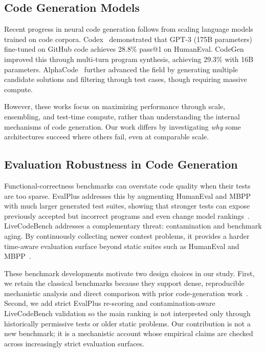\documentclass[preprint,12pt,authoryear]{elsarticle}
\begin{document}
\subsection{Code Generation Models}

Recent progress in neural code generation follows from scaling language models trained on code corpora. Codex~\cite{chen2021humaneval} demonstrated that GPT-3 (175B parameters) fine-tuned on GitHub code achieves 28.8\% pass@1 on HumanEval. CodeGen~\cite{nijkamp2022codegen} improved this through multi-turn program synthesis, achieving 29.3\% with 16B parameters. AlphaCode~\cite{li2022competition} further advanced the field by generating multiple candidate solutions and filtering through test cases, though requiring massive compute.

However, these works focus on maximizing performance through scale, ensembling, and test-time compute, rather than understanding the internal mechanisms of code generation. Our work differs by investigating \emph{why} some architectures succeed where others fail, even at comparable scale.

\subsection{Evaluation Robustness in Code Generation}

Functional-correctness benchmarks can overstate code quality when their tests are too sparse. EvalPlus addresses this by augmenting HumanEval and MBPP with much larger generated test suites, showing that stronger tests can expose previously accepted but incorrect programs and even change model rankings~\cite{liu2023evalplus}. LiveCodeBench addresses a complementary threat: contamination and benchmark aging. By continuously collecting newer contest problems, it provides a harder time-aware evaluation surface beyond static suites such as HumanEval and MBPP~\cite{jain2024livecodebench}.

These benchmark developments motivate two design choices in our study. First, we retain the classical benchmarks because they support dense, reproducible mechanistic analysis and direct comparison with prior code-generation work~\cite{chen2021humaneval,austin2021program}. Second, we add strict EvalPlus re-scoring and contamination-aware LiveCodeBench validation so the main ranking is not interpreted only through historically permissive tests or older static problems. Our contribution is not a new benchmark; it is a mechanistic account whose empirical claims are checked across increasingly strict evaluation surfaces.
\end{document}
